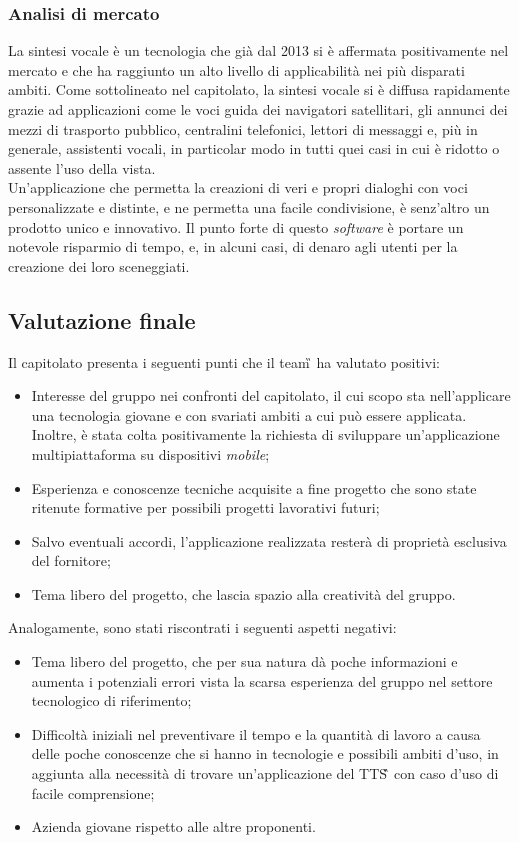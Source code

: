 \subsubsection{Analisi di mercato}
La sintesi vocale è un tecnologia che già dal 2013 si è affermata positivamente nel mercato e che ha raggiunto un alto livello di applicabilità nei più disparati ambiti. Come sottolineato nel capitolato, la sintesi vocale si è diffusa rapidamente grazie ad applicazioni come le voci guida dei navigatori satellitari, gli annunci dei mezzi di trasporto pubblico, centralini telefonici, lettori di messaggi e, più in generale, assistenti vocali, in particolar modo in tutti quei casi in cui è ridotto o assente l'uso della vista.\\
Un'applicazione che permetta la creazioni di veri e propri dialoghi con voci personalizzate e distinte, e ne permetta una facile condivisione, è senz'altro un prodotto unico e innovativo. Il punto forte di questo \textit{software} è portare un notevole risparmio di tempo, e, in alcuni casi, di denaro agli utenti per la creazione dei loro sceneggiati.

\subsection{Valutazione finale}
Il capitolato presenta i seguenti punti che il team\G\, ha valutato positivi:
\begin{itemize}
\item Interesse del gruppo nei confronti del capitolato, il cui scopo sta nell'applicare una tecnologia giovane e con svariati ambiti a cui può essere applicata. Inoltre, è stata colta positivamente la richiesta di sviluppare un'applicazione multipiattaforma su dispositivi \textit{mobile};
\item Esperienza e conoscenze tecniche acquisite a fine progetto che sono state ritenute formative per possibili progetti lavorativi futuri;
\item Salvo eventuali accordi, l'applicazione realizzata resterà di proprietà esclusiva del fornitore;
\item Tema libero del progetto, che lascia spazio alla creatività del gruppo.
\end{itemize}
Analogamente, sono stati riscontrati i seguenti aspetti negativi:
\begin{itemize}
\item Tema libero del progetto, che per sua natura dà poche informazioni e aumenta i potenziali errori vista la scarsa esperienza del gruppo nel settore tecnologico di riferimento;
\item Difficoltà iniziali nel preventivare il tempo e la quantità di lavoro a causa delle poche conoscenze che si hanno in tecnologie e possibili ambiti d'uso, in aggiunta alla necessità di trovare un'applicazione del TTS\G\, con caso d'uso di facile comprensione;
\item Azienda giovane rispetto alle altre proponenti.
\end{itemize}


